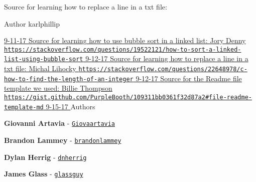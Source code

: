 Source for learning how to replace a line in a txt file\+:
\begin{DoxyItemize}
\item \begin{DoxyAuthor}{Author}
karlphillip
\end{DoxyAuthor}

\item \hyperlink{}{9-\/11-\/17 Source for learning how to use bubble sort in a linked list\+: Jory Denny \href{https://stackoverflow.com/questions/19522121/how-to-sort-a-linked-list-using-bubble-sort}{\tt https\+://stackoverflow.\+com/questions/19522121/how-\/to-\/sort-\/a-\/linked-\/list-\/using-\/bubble-\/sort} 9-\/12-\/17 Source for learning how to replace a line in a txt file\+: Michal Lihocky \href{https://stackoverflow.com/questions/22648978/c-how-to-find-the-length-of-an-integer}{\tt https\+://stackoverflow.\+com/questions/22648978/c-\/how-\/to-\/find-\/the-\/length-\/of-\/an-\/integer} 9-\/12-\/17 Source for the Readme file template we used\+: Billie Thompson \href{https://gist.github.com/PurpleBooth/109311bb0361f32d87a2#file-readme-template-md}{\tt https\+://gist.\+github.\+com/\+Purple\+Booth/109311bb0361f32d87a2\#file-\/readme-\/template-\/md} 9-\/15-\/17 }Authors
\item {\bfseries Giovanni Artavia} -\/ \href{https://github.com/Giovaartavia}{\tt Giovaartavia}
\item {\bfseries Brandon Lammey} -\/ \href{https://github.com/brandonlammey}{\tt brandonlammey}
\item {\bfseries Dylan Herrig} -\/ \href{https://github.com/dnherrig}{\tt dnherrig}
\item {\bfseries James Glass} -\/ \href{https://github.com/glassguy}{\tt glassguy} 
\end{DoxyItemize}